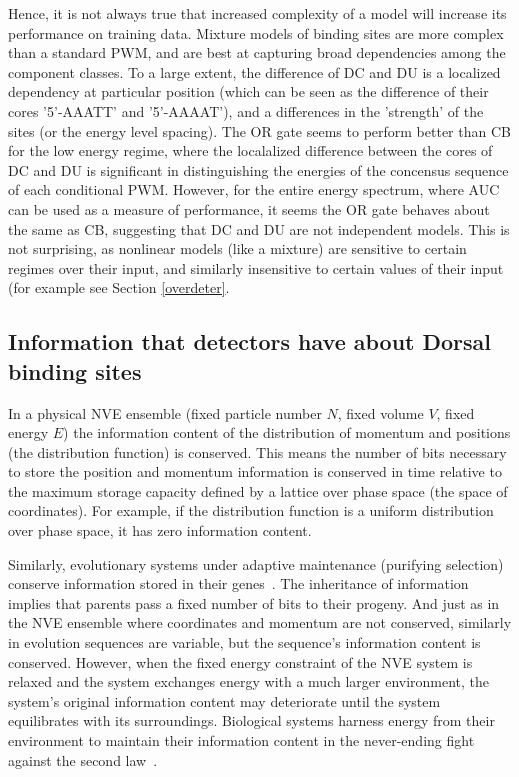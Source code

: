 Hence, it is not always true that increased complexity of a model will increase its performance on training data.  Mixture models of binding sites are more complex than a standard PWM, and are best at capturing broad dependencies among the component classes.  To a large extent, the difference of DC and DU is a localized dependency at particular position (which can be seen as the difference of their cores '5'-AAATT' and '5'-AAAAT'), and a differences in the 'strength' of the sites (or the energy level spacing).  The OR gate seems to perform better than CB for the low energy regime, where the localalized difference between the cores of DC and DU is significant in distinguishing the energies of the concensus sequence of each conditional PWM.  However, for the entire energy spectrum, where AUC can be used as a measure of performance, it seems the OR gate behaves about the same as CB, suggesting that DC and DU are not independent models.  This is not surprising, as nonlinear models (like a mixture) are sensitive to certain regimes over their input, and similarly insensitive to certain values of their input (for example see Section \ref{overdeter}.    
  
  

 \subsection{Information that detectors have about Dorsal binding sites}
In a physical NVE ensemble (fixed particle number $N$, fixed volume $V$, fixed energy $E$) the information content of the distribution of momentum and positions (the distribution function) is conserved.  This means the number of bits necessary to store the position and momentum information is conserved in time relative to the maximum storage capacity defined by a lattice over phase space (the space of coordinates).  For example, if the distribution function is a uniform distribution over phase space, it has zero information content.  

Similarly, evolutionary systems under adaptive maintenance (purifying selection) conserve information stored in their genes~\cite{pmid22320231}.  The inheritance of information implies that parents pass a fixed number of bits to their progeny.  And just as in the NVE ensemble where coordinates and momentum are not conserved, similarly in evolution sequences are variable, but the sequence's  information content is conserved.  However, when the fixed energy constraint of the NVE system is relaxed and the system exchanges energy with a much larger environment, the system's original information content may deteriorate until the system equilibrates with its surroundings. Biological systems harness energy from their environment to maintain their information content in the never-ending fight against the second law~\cite{Adami2002,Carothersetal2004}.

